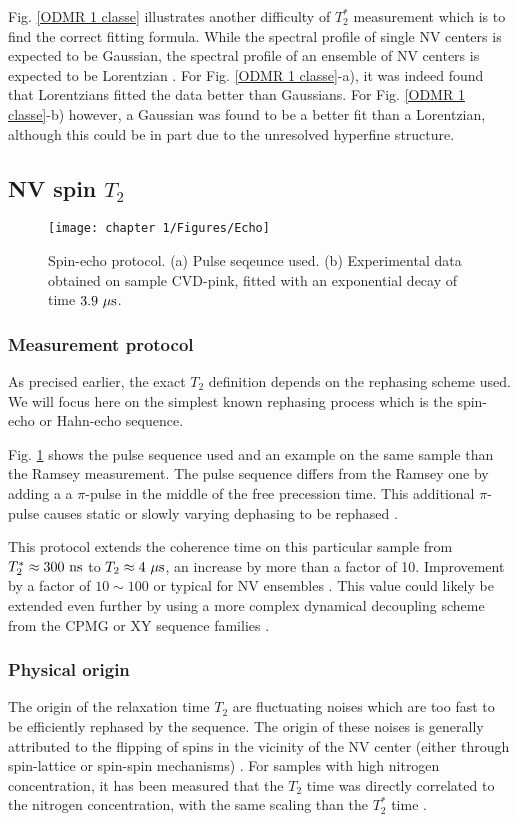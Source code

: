 \documentclass[a4paper, 11pt]{book}
\begin{document}
Fig. \ref{ODMR 1 classe} illustrates another difficulty of $T_2^*$ measurement which is to find the correct fitting formula. While the spectral profile of single NV centers is expected to be Gaussian, the spectral profile of an ensemble of NV centers  is expected to be Lorentzian \citep{dobrovitski2008decoherence, hall2014analytic}. For Fig. \ref{ODMR 1 classe}-a), it was indeed found that Lorentzians fitted the data better than Gaussians. For Fig. \ref{ODMR 1 classe}-b) however, a Gaussian was found to be a better fit than a Lorentzian, although this could be in part due to the unresolved hyperfine structure.

\subsection{NV spin $T_2$}
\label{sec T2 echo}
\begin{figure}[h!]
\centering
\texttt{[image: chapter 1/Figures/Echo]}
\caption{Spin-echo protocol. (a) Pulse seqeunce used. (b) Experimental data obtained on sample CVD-pink, fitted with an exponential decay of time $3.9\ \rm{\mu s}$.} 
\label{Echo}
\end{figure}
\subsubsection{Measurement protocol}
As precised earlier, the exact $T_2$ definition depends on the rephasing scheme used. We will focus here on the simplest known rephasing process which is the spin-echo or Hahn-echo sequence.

Fig. \ref{Echo} shows the pulse sequence used and an example on the same sample than the Ramsey measurement. The pulse sequence differs from the Ramsey one by adding a a $\pi$-pulse in the middle of the free precession time. This additional $\pi$-pulse causes static or slowly varying dephasing to be rephased \citep{hahn1950spin}. 

This protocol extends the coherence time on this particular sample from $T_2^* \approx 300\ \rm ns$ to $T_2 \approx 4\ \rm{\mu s}$, an increase by more than a factor of 10. Improvement by a factor of $10 \sim 100$ or typical for NV ensembles \citep{barry2020sensitivity}. This value could likely be extended even further by using a more complex dynamical decoupling scheme from the CPMG or XY sequence families \citep{naydenov2011dynamical, bar2012suppression}.

\subsubsection{Physical origin}
The origin of the relaxation time $T_2$ are fluctuating noises which are too fast to be efficiently rephased by the sequence. The origin of these noises is generally attributed to the flipping of spins in the vicinity of the NV center (either through spin-lattice or spin-spin mechanisms) \citep{hall2014analytic}. For samples with high nitrogen concentration, it has been measured that the $T_2$ time  was directly correlated to the nitrogen concentration, with the same scaling than the $T_2^*$ time \citep{bauch2019decoherence}.
\end{document}
